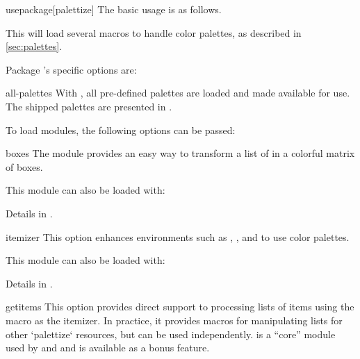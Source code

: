 \documentclass[a4paper, 11pt]{article}
\begin{document}
\begin{macro*}{usepackage}{}[palettize]
    The basic usage is as follows.

    \begin{latexcode}
        \usepackage{palettize}
    \end{latexcode}

    This will load several macros to handle color palettes, as described in \cref{sec:palettes}.

    \bigskip
    Package 's specific options are:

    \begin{option}{all-palettes}{}
        With , all pre-defined palettes are loaded and made available for use. The shipped palettes are presented in .
    \end{option}

    \bigskip
    To load modules, the following options can be passed:

    \begin{option}{boxes}{}
        The module  provides an easy way to transform a list of  in a colorful matrix of boxes.

        This module can also be loaded with:
        \begin{latexcode}
            \usepackage{palettize-boxes}
        \end{latexcode}

        Details in .
    \end{option}

    \begin{option}{itemizer}{}
        This option enhances environments such as , , and  to use color palettes.

        This module can also be loaded with:
        \begin{latexcode}
            \usepackage{palettize-itemizer}
        \end{latexcode}

        Details in .
    \end{option}

    \begin{option}{getitems}{}
        This option provides direct support to processing lists of items using the macro \latexinline{\item} as the itemizer. In practice, it provides macros for manipulating lists for other `palettize` resources, but can be used independently.  is a ``core'' module used by  and  and is available as a bonus feature.


\end{option}
\end{macro*}
\end{document}
